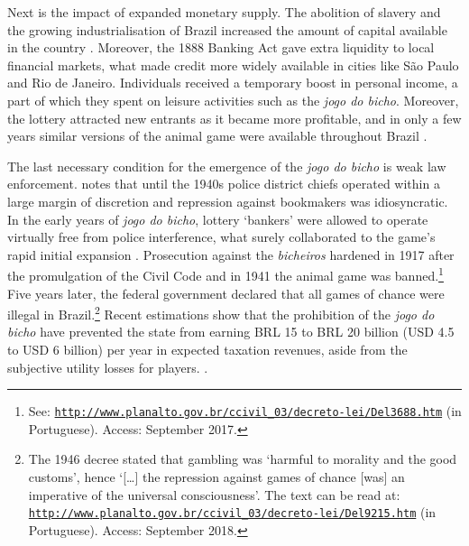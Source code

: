 \documentclass[a4paper,12pt]{article}
\begin{document}
Next is the impact of expanded monetary supply. The abolition of slavery and the growing industrialisation of Brazil increased the amount of capital available in the country \citep{franco1987reformas, schulz2008financial}. Moreover, the 1888 Banking Act gave extra liquidity to local financial markets, what made credit more widely available in cities like São Paulo and Rio de Janeiro. Individuals received a temporary boost in personal income, a part of which they spent on leisure activities such as the \textit{jogo do bicho}. Moreover, the lottery attracted new entrants as it became more profitable, and in only a few years similar versions of the animal game were available throughout Brazil \citep[79]{da1999aguias}.  

The last necessary condition for the emergence of the \textit{jogo do bicho} is weak law enforcement. \citet[69--100]{chazkel2011laws} notes that until the 1940s police district chiefs operated within a large margin of discretion and repression against bookmakers was idiosyncratic. In the early years of \textit{jogo do bicho}, lottery `bankers' were allowed to operate virtually free from police interference, what surely collaborated to the game's rapid initial expansion \citep[544]{chazkel2007beyond}. Prosecution against the \textit{bicheiros} hardened in 1917 after the promulgation of the Civil Code and in 1941 the animal game was banned.\footnote{See: \href{http://www.planalto.gov.br/ccivil_03/decreto-lei/Del3688.htm}{\texttt{http://www.planalto.gov.br/ccivil\_03/decreto-lei/Del3688.htm}} (in Portuguese). Access: September 2017.} Five years later, the federal government declared that all games of chance were illegal in Brazil.\footnote{The 1946 decree stated that gambling was `harmful to morality and the good customs', hence `[\dots] the repression against games of chance [was] an imperative of the universal consciousness'. The text can be read at: \href{http://www.planalto.gov.br/ccivil_03/decreto-lei/Del9215.htm}{\texttt{http://www.planalto.gov.br/ccivil\_03/decreto-lei/Del9215.htm}} (in Portuguese). Access: September 2018.} Recent estimations show that the prohibition of the \textit{jogo do bicho} have prevented the state from earning BRL 15 to BRL 20 billion (USD 4.5 to USD 6 billion) per year in expected taxation revenues, aside from the subjective utility losses for players. \citep{fsp2016legalizarbicho}.
\end{document}
